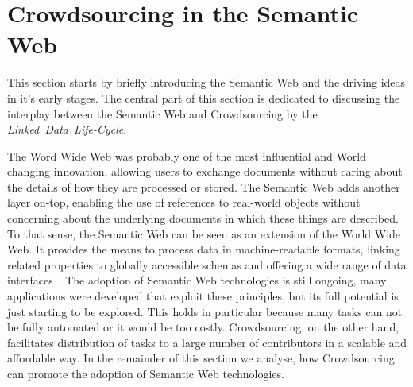 \section{Crowdsourcing in the Semantic Web}
This section starts by briefly introducing the Semantic Web and the driving ideas in it's early stages. The central part of this section is dedicated to discussing the interplay between the Semantic Web and Crowdsourcing by the \textit{Linked~Data~Life-Cycle}. 

The Word Wide Web was probably one of the most influential and World changing innovation, allowing users to exchange documents without caring about the details of how they are processed or stored. The Semantic Web adds another layer on-top, enabling the use of references to real-world objects without concerning about the underlying documents in which these things are described. To that sense, the Semantic Web can be seen as an extension of the World Wide Web. It provides the means to process data in machine-readable formats, linking related properties to globally accessible schemas and offering a wide range of data interfaces~\cite{hendler2010}.
The adoption of Semantic Web technologies is still ongoing, many applications were developed that exploit these principles, but its full potential is just starting to be explored. This holds in particular because many tasks can not be fully automated or it would be too costly. Crowdsourcing, on the other hand, facilitates distribution of tasks to a large number of contributors in a scalable and affordable way. In the remainder of this section we analyse, how Crowdsourcing can promote the adoption of Semantic Web technologies. 

